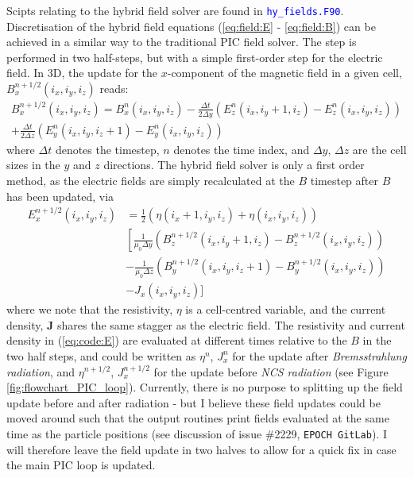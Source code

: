 \documentclass[12pt]{article}
\numberwithin{equation}{section}
\begin{document}
Scipts relating to the hybrid field solver are found in \textcolor{blue}{\texttt{hy\_fields.F90}}. Discretisation of the hybrid field equations (\ref{eq:field:E} - \ref{eq:field:B}) can be achieved in a similar way to the traditional PIC field solver. The step is performed in two half-steps, but with a simple first-order step for the electric field. In 3D, the update for the $x$-component of the magnetic field in a given cell, $B_x^{n+1/2}(i_x,i_y,i_z)$ reads:
%
\begin{equation} \label{eq:code:B}
\begin{aligned}
  B_x^{n+1/2}(i_x,i_y,i_z) = B_x^{n}(i_x,i_y,i_z) - \frac{\Delta t}{2\Delta y}\left(E_z^n(i_x,i_y+1,i_z) - E_z^n(i_x,i_y,i_z)\right) \\ + \frac{\Delta t}{2\Delta z}\left(E_y^n(i_x,i_y,i_z+1) - E_y^n(i_x,i_y,i_z)\right)
\end{aligned}
\end{equation}
%
where $\Delta t$ denotes the timestep, $n$ denotes the time index, and $\Delta y$, $\Delta z$ are the cell sizes in the $y$ and $z$ directions. The hybrid field solver is only a first order method, as the electric fields are simply recalculated at the $B$ timestep after $B$ has been updated, via
%
\begin{equation} \label{eq:code:E}
\begin{aligned}
  E_x^{n+1/2}(i_x,i_y,i_z) &= \frac{1}{2}\left(\eta(i_x+1,i_y,i_z) + \eta(i_x,i_y,i_z)\right) \\ 
  &\left[\frac{1}{\mu_0\Delta y} \left(B_z^{n+1/2}(i_x,i_y+1,i_z) - B_z^{n+1/2}(i_x,i_y,i_z)\right)\right.\\
  &- \frac{1}{\mu_0 \Delta z} \left(B_y^{n+1/2}(i_x,i_y,i_z+1) - B_y^{n+1/2}(i_x,i_y,i_z)\right) \\
  &- J_x(i_x,i_y,i_z)]
\end{aligned}
\end{equation}
%
where we note that the resistivity, $\eta$ is a cell-centred variable, and the current density, $\textbf{J}$ shares the same stagger as the electric field. The resistivity and current density in (\ref{eq:code:E}) are evaluated at different times relative to the $B$ in the two half steps, and could be written as $\eta^{n}$, $J_x^{n}$ for the update after \textit{Bremsstrahlung radiation}, and $\eta^{n+1/2}$, $J_x^{n+1/2}$ for the update before \textit{NCS radiation} (see Figure \ref{fig:flowchart_PIC_loop}). Currently, there is no purpose to splitting up the field update before and after radiation - but I believe these field updates could be moved around such that the output routines print fields evaluated at the same time as the particle positions (see discussion of issue \#2229, \texttt{EPOCH GitLab}). I will therefore leave the field update in two halves to allow for a quick fix in case the main PIC loop is updated.
\end{document}
